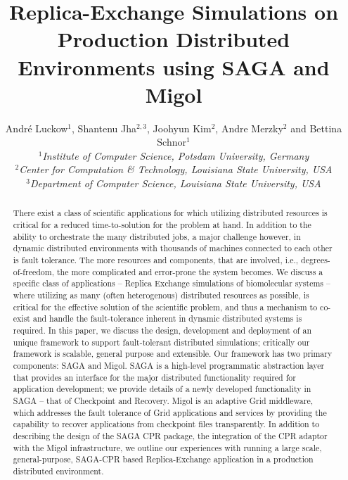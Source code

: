 \documentclass[times, 10pt,twocolumn]{article}
\title{Replica-Exchange Simulations on Production Distributed
  Environments using SAGA and Migol}
\author{
  Andr\'e Luckow$^{1}$, Shantenu Jha$^{2,3}$, Joohyun Kim$^{2}$, Andre Merzky$^{2}$ and Bettina Schnor$^{1}$\\
  \small{\emph{$^{1}$Institute of Computer Science, Potsdam University, Germany}}\\
  \small{\emph{$^{2}$Center for Computation \& Technology, Louisiana State University, USA}}\\
  \small{\emph{$^{3}$Department of Computer Science, Louisiana State University, USA}}\\
}
\begin{document}
 


\maketitle    

\begin{abstract}
  There exist a class of scientific applications for which utilizing
  distributed resources is critical for a reduced time-to-solution for
  the problem at hand. In addition to the ability to orchestrate the
  many distributed jobs, a major challenge however, in dynamic
  distributed environments with thousands of machines connected to
  each other is fault tolerance. The more resources and components,
  that are involved, i.e., degrees-of-freedom, the more complicated
  and error-prone the system becomes.  We discuss a specific class of
  applications -- Replica Exchange simulations of biomolecular systems
  -- where utilizing as many (often heterogenous) distributed
  resources as possible, is critical for the effective solution of the
  scientific problem, and thus a mechanism to co-exist and handle the
  fault-tolerance inherent in dynamic distributed systems is
  required. In this paper, we discuss the design, development and
  deployment of an unique framework to support fault-tolerant
  distributed simulations; critically our framework is scalable,
  general purpose and extensible. Our framework has two primary
  components: SAGA and Migol.  SAGA is a high-level programmatic
  abstraction layer that provides an interface for the major
  distributed functionality required for application development; we
  provide details of a newly developed functionality in SAGA -- that
  of Checkpoint and Recovery. Migol is an adaptive Grid middleware,
  which addresses the fault tolerance of Grid applications and
  services by providing the capability to recover applications from
  checkpoint files transparently.  In addition to describing the
  design of the SAGA CPR package, the integration of the CPR adaptor
  with the Migol infrastructure, we outline our experiences with
  running a large scale, general-purpose, SAGA-CPR based
  Replica-Exchange application in a production distributed
  environment.

    

\end{abstract}
\end{document}
